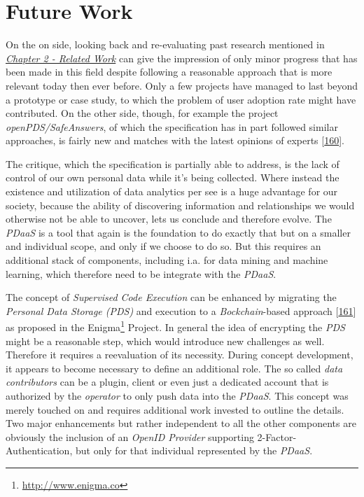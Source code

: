 \documentclass[12pt,english,a4paper,titlepage,cleardoublepage=empty,dottedtoc]{report}
\renewcommand{\href}[2]{#2\footnote{\url{#1}}}
\begin{document}
\section{Future Work}\label{future-work}

On the on side, looking back and re-evaluating past research mentioned
in \emph{\protect\hyperlink{related-work}{Chapter 2 - Related Work}} can
give the impression of only minor progress that has been made in this
field despite following a reasonable approach that is more relevant
today then ever before. Only a few projects have managed to last beyond
a prototype or case study, to which the problem of user adoption rate
might have contributed. On the other side, though, for example the
project \emph{openPDS/SafeAnswers}, of which the specification has in
part followed similar approaches, is fairly new and matches with the
latest opinions of experts
{[}\protect\hyperlink{ref-web_2017_distributed-future-is-personal}{160}{]}.

The critique, which the specification is partially able to address, is
the lack of control of our own personal data while it's being collected.
Where instead the existence and utilization of data analytics per see is
a huge advantage for our society, because the ability of discovering
information and relationships we would otherwise not be able to uncover,
lets us conclude and therefore evolve. The \emph{PDaaS} is a tool that
again is the foundation to do exactly that but on a smaller and
individual scope, and only if we choose to do so. But this requires an
additional stack of components, including i.a. for data mining and
machine learning, which therefore need to be integrate with the
\emph{PDaaS}.

The concept of \emph{Supervised Code Execution} can be enhanced by
migrating the \emph{Personal Data Storage (PDS)} and execution to a
\emph{Bockchain}-based approach
{[}\protect\hyperlink{ref-paper_2015_decentralizing-privacy-using-blockchain-to-protect-personal-data}{161}{]}
as proposed in the \href{http://www.enigma.co}{Enigma} Project. In
general the idea of encrypting the \emph{PDS} might be a reasonable
step, which would introduce new challenges as well. Therefore it
requires a reevaluation of its necessity. During concept development, it
appears to become necessary to define an additional role. The so called
\emph{data contributors} can be a plugin, client or even just a
dedicated account that is authorized by the \emph{operator} to only push
data into the \emph{PDaaS}. This concept was merely touched on and
requires additional work invested to outline the details. Two major
enhancements but rather independent to all the other components are
obviously the inclusion of an \emph{OpenID Provider} supporting
2-Factor-Authentication, but only for that individual represented by the
\emph{PDaaS}.
\end{document}
